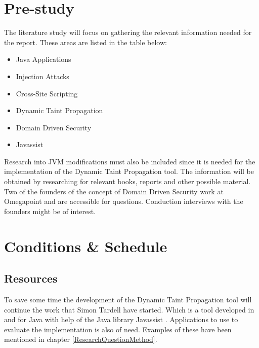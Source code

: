 \documentclass{../kththesis}
\begin{document}
	
	
	\chapter{Pre-study} \label{Pre-study}
	The literature study will focus on gathering the relevant information needed for the report. These areas are listed in the table below:
		
		\begin{itemize}  
			\item Java Applications
			\item Injection Attacks
			\item Cross-Site Scripting
			\item Dynamic Taint Propagation
			\item Domain Driven Security
			\item Javassist
		\end{itemize}
	
	\noindent
	Research into JVM modifications must also be included since it is needed for the implementation of the Dynamic Taint Propagation tool. The information will be obtained by researching for relevant books, reports and other possible material. Two of the founders of the concept of Domain Driven Security work at Omegapoint and are accessible for questions. Conduction interviews with the founders might be of interest.
	
	
	
	\chapter{Conditions \& Schedule}
	\section{Resources}
	To save some time the development of the Dynamic Taint Propagation tool will continue the work that Simon Tardell have started. Which is a tool developed in and for Java with help of the Java library Javassist \parencite{Javassist}. Applications to use to evaluate the implementation is also of need. Examples of these have been mentioned in chapter \ref{ResearchQuestionMethod}.
	
\end{document}
